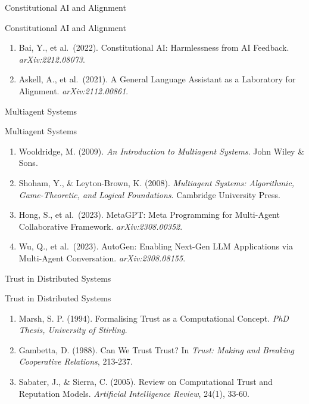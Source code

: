 \documentclass[
  ignorenonframetext,
]{beamer}
\begin{document}
\begin{frame}[allowframebreaks]{Constitutional AI and Alignment}
\protect{}\label{constitutional-ai-and-alignment}
\end{frame}

\begin{frame}[allowframebreaks]{Constitutional AI and Alignment}
\begin{enumerate}
\item
  Bai, Y., et al.~(2022). Constitutional AI: Harmlessness from AI
  Feedback. \emph{arXiv:2212.08073}.
\item
  Askell, A., et al.~(2021). A General Language Assistant as a
  Laboratory for Alignment. \emph{arXiv:2112.00861}.
\end{enumerate}
\end{frame}

\begin{frame}[allowframebreaks]{Multiagent Systems}
\protect{}\label{multiagent-systems}
\end{frame}

\begin{frame}[allowframebreaks]{Multiagent Systems}
\begin{enumerate}
\item
  Wooldridge, M. (2009). \emph{An Introduction to Multiagent Systems}.
  John Wiley \& Sons.
\item
  Shoham, Y., \& Leyton-Brown, K. (2008). \emph{Multiagent Systems:
  Algorithmic, Game-Theoretic, and Logical Foundations}. Cambridge
  University Press.
\item
  Hong, S., et al.~(2023). MetaGPT: Meta Programming for Multi-Agent
  Collaborative Framework. \emph{arXiv:2308.00352}.
\item
  Wu, Q., et al.~(2023). AutoGen: Enabling Next-Gen LLM Applications via
  Multi-Agent Conversation. \emph{arXiv:2308.08155}.
\end{enumerate}
\end{frame}

\begin{frame}[allowframebreaks]{Trust in Distributed Systems}
\protect{}\label{trust-in-distributed-systems}
\end{frame}

\begin{frame}[allowframebreaks]{Trust in Distributed Systems}
\begin{enumerate}
\item
  Marsh, S. P. (1994). Formalising Trust as a Computational Concept.
  \emph{PhD Thesis, University of Stirling}.
\item
  Gambetta, D. (1988). Can We Trust Trust? In \emph{Trust: Making and
  Breaking Cooperative Relations}, 213-237.
\item
  Sabater, J., \& Sierra, C. (2005). Review on Computational Trust and
  Reputation Models. \emph{Artificial Intelligence Review}, 24(1),
  33-60.
\end{enumerate}
\end{frame}
\end{document}
